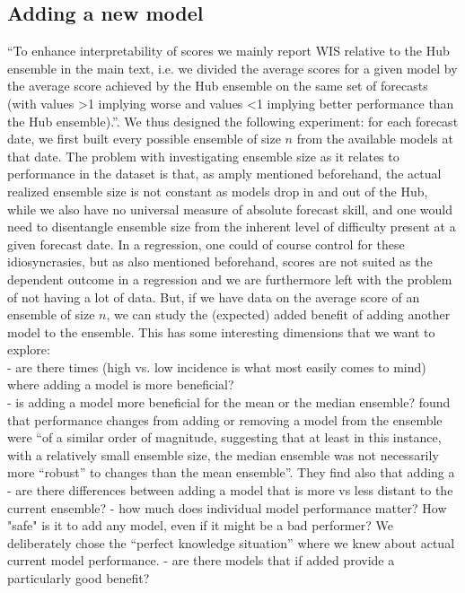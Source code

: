 \subsection{Adding a new model}
``To enhance
interpretability of scores we mainly report WIS relative to the Hub ensemble in the main text, i.e. we divided
the average scores for a given model by the average score achieved by the Hub ensemble on the same set of
forecasts (with values >1 implying worse and values <1 implying better performance than the Hub ensemble).''\cite{bosse_comparing_2021-1}.
We thus designed the following experiment: for each forecast date, we first built every possible ensemble of size $n$ from the available models at that date. The problem with investigating ensemble size as it relates to performance in the dataset is that, as amply mentioned beforehand, the actual realized ensemble size is not constant as models drop in and out of the Hub, while we also have no universal measure of absolute forecast skill, and one would need to disentangle ensemble size from the inherent level of difficulty present at a given forecast date. In a regression, one could of course control for these idiosyncrasies, but as also mentioned beforehand, scores are not suited as the dependent outcome in a regression and we are furthermore left with the problem of not having a lot of data. But, if we have data on the average score of an ensemble of size $n$, we can study the (expected) added benefit of adding another model to the ensemble. This has some interesting dimensions that we want to explore:\\
- are there times (high vs. low incidence is what most easily comes to mind) where adding a model is more beneficial?\\
- is adding a model more beneficial for the mean or the median ensemble? \cite{bosse_comparing_2021-1} found that performance changes from adding or removing a model from the ensemble were ``of a similar order of magnitude, suggesting that at least in this instance, with a relatively small ensemble size, the median ensemble was not necessarily more ``robust'' to changes than the mean ensemble''. They find also that adding a 
- are there differences between adding a model that is more vs less distant to the current ensemble?
- how much does individual model performance matter? How "safe" is it to add any model, even if it might be a bad performer? We deliberately chose the ``perfect knowledge situation'' where we knew about actual current model performance. 
- are there models that if added provide a particularly good benefit?

